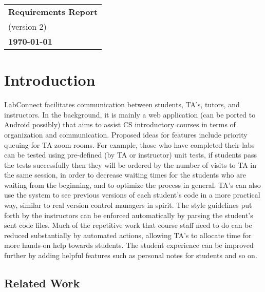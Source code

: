 \documentclass[a4paper, 12pt]{article}
\begin{document}
    \begin{table}[h!]
        \renewcommand{\arraystretch}{1.5}
        \centering
        \begin{tabular}{ |>{\centering\arraybackslash}m{15.15cm}| }
            \hline
            \Large \textbf{Requirements Report} \\
            \small (version 2) \\
            \small \textbf{\today} \\
            \hline
        \end{tabular}
    \end{table}


    \section{Introduction}

    LabConnect facilitates communication between students, TA's, tutors,
    and instructors. In the background, it is mainly a web application
    (can be ported to Android possibly) that aims to assist CS introductory
    courses in terms of organization and communication. Proposed ideas for
    features include priority queuing for TA zoom rooms. For example, those
    who have completed their labs can be tested using pre-defined (by TA or
    instructor) unit tests, if students pass the tests successfully then they will be
    ordered by the number of visits to TA in the same session, in order to decrease
    waiting times for the students who are waiting from the beginning, and
    to optimize the process in general. TA's can also use the system to see
    previous versions of each student's code in a more practical way,
    similar to real version control managers in spirit. The style guidelines
    put forth by the instructors can be enforced automatically by parsing
    the student's sent code files. Much of the repetitive work that course
    staff need to do can be reduced substantially by automated actions,
    allowing TA's to allocate time for more hands-on help towards students.
    The student experience can be improved further by adding helpful
    features such as personal notes for students and so on.

    \subsection{Related Work}
\end{document}

